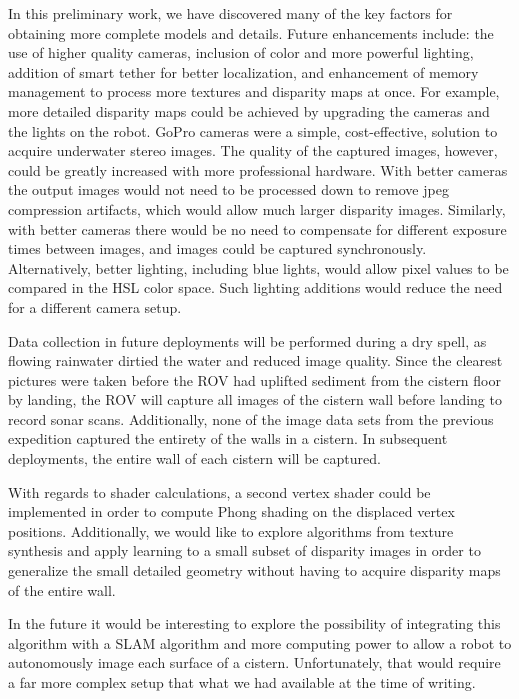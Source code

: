 \documentclass[twocolumn]{article}
\begin{document}
In this preliminary work, we have discovered many of the key factors for obtaining more complete models and details.  Future enhancements include: the use of higher quality cameras, inclusion of color and more powerful lighting, addition of smart tether for better localization, and enhancement of memory management to process more textures and disparity maps at once.
For example, more detailed disparity maps could be achieved by upgrading the cameras and the lights on the robot.
GoPro cameras were a simple, cost-effective, solution to acquire underwater stereo images.
The quality of the captured images, however, could be greatly increased with more professional hardware.
With better cameras the output images would not need to be processed down to remove jpeg compression artifacts, which would allow much larger disparity images.  
Similarly, with better cameras there would be no need to compensate for different exposure times between images, and images could be captured synchronously.
Alternatively, better lighting, including blue lights, would allow pixel values to be compared in the HSL color space.
Such lighting additions would reduce the need for a different camera setup.

Data collection in future deployments will be performed during a dry spell, as flowing rainwater dirtied the water and reduced image quality. Since the clearest pictures were taken before the ROV had uplifted sediment from the cistern floor by landing, the ROV will capture all images of the cistern wall before landing to record sonar scans. Additionally, none of the image data sets from the previous expedition captured the entirety of the walls in a cistern. In subsequent deployments, the entire wall of each cistern will be captured.

With regards to shader calculations, a second vertex shader could be implemented in order to compute Phong shading on the displaced vertex positions. Additionally, we would like to explore algorithms from texture synthesis and apply learning to a small subset of disparity images in order to generalize the small detailed geometry without having to acquire disparity maps of the entire wall.

In the future it would be interesting to explore the possibility of integrating this algorithm with a SLAM algorithm and more computing power to allow a robot to autonomously image each surface of a cistern. 
Unfortunately, that would require a far more complex setup that what we had available at the time of writing.





\end{document}
